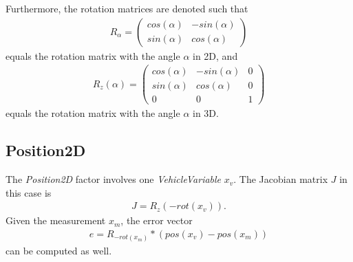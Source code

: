 Furthermore, the rotation matrices are denoted such that
\begin{align}
	R_\alpha =
	\begin{pmatrix}
		cos(\alpha) & -sin(\alpha)\\
		sin(\alpha) &  cos(\alpha)
	\end{pmatrix}
\end{align}
equals the rotation matrix with the angle $\alpha$ in 2D, and
\begin{align}
	R_z(\alpha) =
	\begin{pmatrix}
		cos(\alpha) & -sin(\alpha) & 0\\
		sin(\alpha) &  cos(\alpha) & 0\\
		          0 &            0 & 1
	\end{pmatrix}
\end{align}
equals the rotation matrix with the angle $\alpha$ in 3D.

\subsection{Position2D}

The \textit{Position2D} factor involves one \textit{VehicleVariable} $x_v$. The Jacobian matrix $J$ in this case is
\begin{align}
	J = R_z(-rot(x_v)).
\end{align}
Given the measurement $x_m$, the error vector
\begin{align}
	e = R_{-rot(x_m)} * (pos(x_v) - pos(x_m))
\end{align}
can be computed as well.

